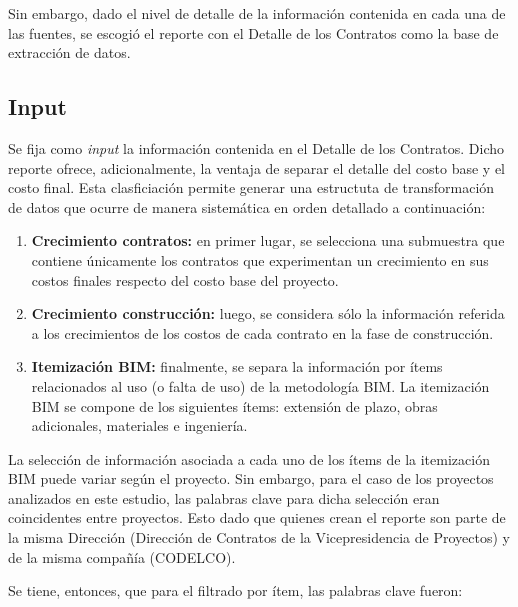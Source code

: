 Sin embargo, dado el nivel de detalle de la información contenida en cada una de las fuentes, se escogió el reporte con el Detalle de los Contratos como la base de extracción de datos.

\subsection{Input}

Se fija como \emph{input} la información contenida en el Detalle de los Contratos. Dicho reporte ofrece, adicionalmente, la ventaja de separar el detalle del costo base y el costo final. Esta clasficiación permite generar una estructuta de transformación de datos que ocurre de manera sistemática en orden detallado a continuación:

\begin{enumerate}
    \item \textbf{Crecimiento contratos:} en primer lugar, se selecciona una submuestra que contiene únicamente los contratos que experimentan un crecimiento en sus costos finales respecto del costo base del proyecto.
    
    \item \textbf{Crecimiento construcción:} luego, se considera sólo la información referida a los crecimientos de los costos de cada contrato en la fase de construcción.
    
    \item \textbf{Itemización BIM:} finalmente, se separa la información por ítems relacionados al uso (o falta de uso) de la metodología BIM. La itemización BIM se compone de los siguientes ítems: extensión de plazo, obras adicionales, materiales e ingeniería.
\end{enumerate}

La selección de información asociada a cada uno de los ítems de la itemización BIM puede variar según el proyecto. Sin embargo, para el caso de los proyectos analizados en este estudio, las palabras clave para dicha selección eran coincidentes entre proyectos. Esto dado que quienes crean el reporte son parte de la misma Dirección (Dirección de Contratos de la Vicepresidencia de Proyectos) y de la misma compañía (CODELCO).

Se tiene, entonces, que para el filtrado por ítem, las palabras clave fueron:

